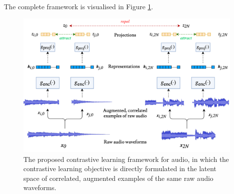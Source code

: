 \documentclass{report}
\begin{document}
The complete framework is visualised in Figure \ref{fig:clmr_model}.

\begin{figure}[t]
    \includegraphics[width=\columnwidth]{figs/clmr_model.png}
    \caption{The proposed contrastive learning framework for audio, in which the contrastive learning objective is directly formulated in the latent space of correlated, augmented examples of the same raw audio waveforms.}
    \label{fig:clmr_model}
\end{figure}
\end{document}

